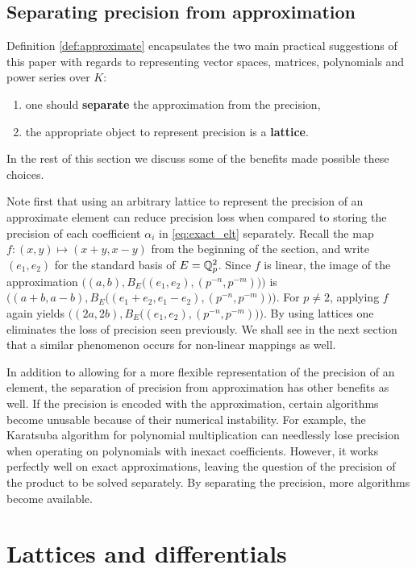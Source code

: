\documentclass{lms}
\begin{document}
\subsection{Separating precision from approximation}
\label{ssec:separation}

Definition \ref{def:approximate} encapsulates the two main practical suggestions of this paper
with regards to representing vector spaces, matrices, polynomials and power series over $K$:
\begin{enumerate}
\item one should \textbf{separate} the approximation from the precision,
\item the appropriate object to represent precision is a \textbf{lattice}.
\end{enumerate}
In the rest of this section we discuss some of the benefits made possible these choices.

Note first that using an arbitrary lattice to represent the precision of an approximate element
can reduce precision loss when compared to storing the precision of each coefficient
$\alpha_i$ in \eqref{eq:exact_elt} separately.  Recall the map 
$f : (x,y) \mapsto (x+y, x-y)$ from the beginning of the section, and write $(e_1, e_2)$
for the standard basis of $E=\mathbb Q_p^2$.  Since $f$ is linear, the image of
the approximation $\bigl((a,b), B_E\bigl((e_1,e_2),(p^{-n}, p^{-m})\bigr)\bigr)$ is
$\bigl((a+b, a-b), B_E\bigl((e_1+e_2, e_1-e_2), (p^{-n}, p^{-m})\bigr)\bigr)$.
For $p \ne 2$, applying $f$ again yields $\bigl((2a, 2b), B_E\bigl((e_1, e_2), (p^{-n}, p^{-m})\bigr)\bigr)$.
By using lattices one eliminates the loss of precision seen previously.
We shall see in the next section that a similar phenomenon occurs for non-linear mappings as well.

In addition to allowing for a more flexible representation of the precision of an element,
the separation of precision from approximation has other benefits as well.  If the precision
is encoded with the approximation, certain algorithms become unusable because of their
numerical instability.  For example, the Karatsuba algorithm for polynomial multiplication \cite{karatsuba-ofman:62a}
can needlessly lose precision when operating on polynomials with inexact coefficients.
However, it works perfectly well on exact approximations, leaving the question of the precision of
the product to be solved separately.  By separating the precision, more algorithms become available.

\section{Lattices and differentials}
\label{sec:mainlemma}
\end{document}
